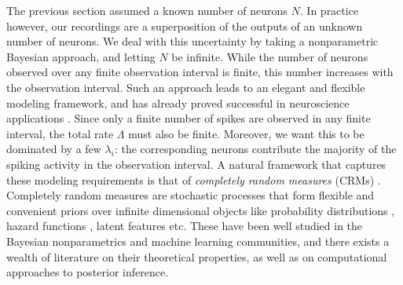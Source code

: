 The previous section assumed a known number of neurons $N$. In practice however, our recordings are a superposition of the outputs of an unknown
number of neurons. We deal with this uncertainty by taking a nonparametric Bayesian approach, and letting $N$ be infinite.
While the number of neurons observed over any finite observation interval is finite, this number increases with the observation interval. 
Such an approach leads to an elegant and flexible modeling framework, and has  already proved successful in neuroscience applications
\citep{WoodBla2008}.
Since only a finite number of spikes are observed in any finite interval, the total rate $\Lambda$ must 
also be finite. Moreover, we want this to be dominated by a few $\lambda_i$: the corresponding neurons contribute the majority of the spiking
activity in the observation interval. 
A natural framework that captures these  modeling requirements is that of \emph{completely random measures} (CRMs) \citep{Kingman:PJM67}.
Completely random measures are stochastic processes that form flexible and convenient priors over
infinite dimensional objects like probability distributions \citep{JamesLP09}, hazard functions \citep{Hjo1990}, latent features \citep{ThiJor2007} etc. 
These have been well studied in the Bayesian nonparametrics and machine learning communities, and there exists a wealth of literature on
their theoretical properties, as well as on computational approaches to posterior inference.

